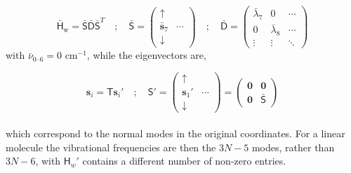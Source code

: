 \documentclass[10pt]{article}
\begin{document}
\begin{equation}
	\bar{\mathsf{H}}_\text{w} = \mathsf{\bar{S} \bar{D}\bar{S}}^T 
	\quad ; \quad
	\bar{\mathsf{S}} = 
	\begin{pmatrix}
		\uparrow & \\
		\bar{\boldsymbol{s}}_7 & \cdots \\
		\downarrow &
	\end{pmatrix}
	\quad ; \quad
	\bar{\mathsf{D}} = 
	\begin{pmatrix}
		\bar{\lambda}_7 &  0& \cdots \\
		0 & \bar{\lambda}_8 & \cdots \\
		\vdots & \vdots & \ddots
	\end{pmatrix}
\end{equation}
with $\bar{\nu}_{0\text{--}6} = 0$ cm${}^{-1}$, while the eigenvectors are,

\begin{equation}
	\boldsymbol{s}_i = \mathsf{T}\boldsymbol{s}_i'
	\quad ; \quad
	\mathsf{S}' = \begin{pmatrix}
		\uparrow & \\
		\boldsymbol{s}_1' & \cdots\\
		\downarrow &
	\end{pmatrix}
    = 
	\begin{pmatrix}
		\boldsymbol{0} & \boldsymbol{0} \\
		\boldsymbol{0} & \bar{\mathsf{S}}
	\end{pmatrix}
\end{equation}
\\
which correspond to the normal modes in the original coordinates. For a linear molecule the vibrational frequencies are then the $3N-5$ modes, rather than $3N-6$, with $\mathsf{H}_w'$ contains a different number of non-zero entries.
\end{document}

